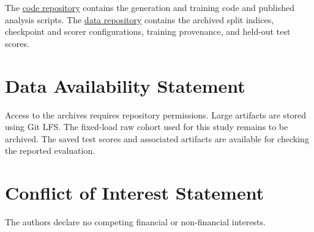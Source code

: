 \documentclass[11pt,a4paper]{article}
\begin{document}
The \href{https://github.com/igmsalinas/fault-converters-code/tree/9e13ccdd263346e2eadd15102fe096393a64d38a}{code repository} contains the generation and training code and published analysis scripts. The \href{https://github.com/igmsalinas/fault-converters-data/tree/4950ecf604fab8b63395201b2d4a28af88fae8e8}{data repository} contains the archived split indices, checkpoint and scorer configurations, training provenance, and held-out test scores.

\section*{Data Availability Statement}
Access to the archives requires repository permissions. Large artifacts are stored using Git LFS. The fixed-load raw cohort used for this study remains to be archived. The saved test scores and associated artifacts are available for checking the reported evaluation.

\section*{Conflict of Interest Statement}
The authors declare no competing financial or non-financial interests.



\end{document}
